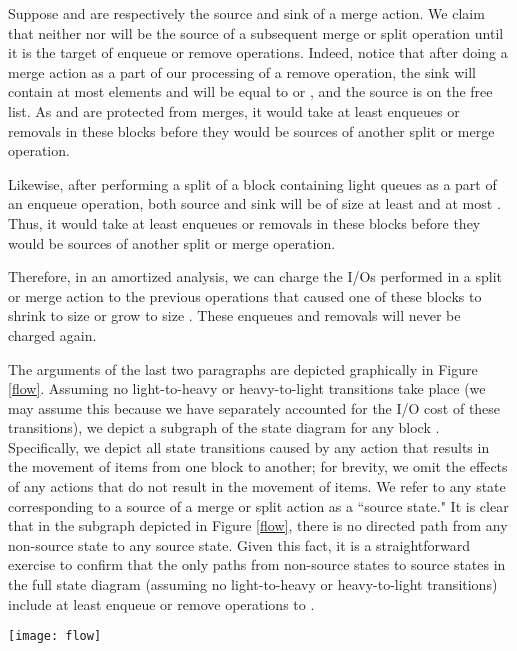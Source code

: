 \documentclass[11pt,letterpaper]{article}
\newcommand{\eat}[1]{}
\begin{document}
Suppose  and  are respectively 
the source and sink of a merge action. We claim that neither  nor  will be the source of a subsequent merge or split operation until it is the target of  enqueue
or remove operations.
Indeed, notice that after doing a merge action as a part of our
processing of a remove operation,
the sink will
contain at most  elements and will be equal to   or , and the source is on the free list.
As  and  are protected from merges, it would take at least  enqueues or removals in these
blocks before they would be sources of another split or merge operation.

Likewise, after performing a split of a block containing light queues as a part of an enqueue operation,
both source and sink will be of size at least  and at most
.
Thus, it would take at least  enqueues or removals in these
blocks before they would be sources of another split or merge operation.

Therefore, in an amortized analysis, we can charge the  I/Os
performed in a split or merge action to the previous  operations
that caused one of these blocks to shrink to size  or grow to
size . These enqueues and removals will never be charged again.

The arguments of the last two paragraphs are depicted graphically in Figure \ref{flow}. Assuming no light-to-heavy or heavy-to-light transitions
take place (we may assume this because we have separately accounted for the I/O cost of these transitions), we depict a subgraph of
the state diagram for any block . Specifically, we depict all state transitions caused by any action that results in the movement of items from one block to another; for brevity, we omit the effects of any actions that do not result in the movement of items. We refer to any state corresponding to a source
of a merge or split action as a ``source state." It is clear that in the subgraph depicted in Figure \ref{flow}, there is no directed path from any non-source state to any
source state. Given this fact, it is a straightforward exercise to confirm that the only paths from non-source states to source states in the full state diagram (assuming no light-to-heavy or heavy-to-light transitions)
include at least  enqueue or remove operations to .
\eat{ in the state diagram
from any non-source state to any source state. As all non-source states in Figure
that for any block  that is a merge sink, merge source, split sink, or split source, at least  enqueue or remove operations are necessary}

\begin{figure*}
\begin{center}
\texttt{[image: flow]}
\caption{A subgraph of the state diagram for any block , depicting all state transitions caused by merge or split actions.  denotes the size of . Ovals denote source states,
while rectangles denote non-source states. Unless otherwise noted, any state depicted is for a block containing light queues.}
\label{flow}
\end{center}
\end{figure*}
\end{document}
